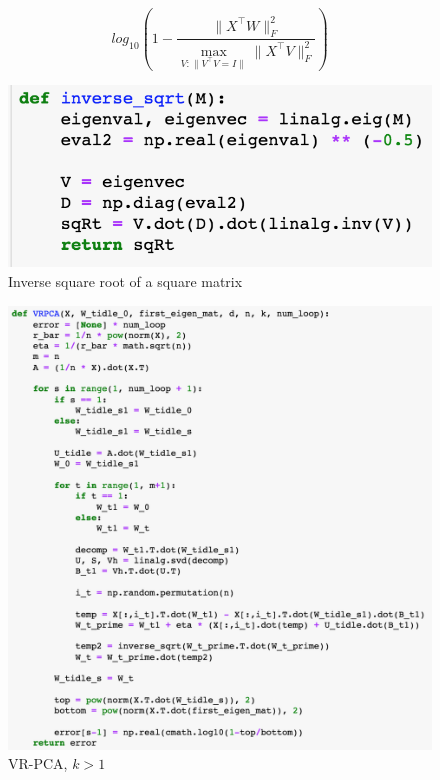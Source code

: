 \documentclass{article}
\begin{document}
\begin{equation}
    log_{10}(1-\frac{\|X^\top W\|^2_F}{\underset{V:\|V^\top V=I\|}{\max}\|X^\top V\|^2_F})
\end{equation}
\begin{figure}[H]
    \centering
    \includegraphics[scale=0.52]{./inv_sqrt.png}
    \caption{Inverse square root of a square matrix}
\end{figure}
\clearpage
\begin{figure}[H]
    \centering
    \includegraphics[scale=0.41]{./VRPCA2.png}
    \caption{VR-PCA, $k>1$}
\end{figure}
\end{document}
